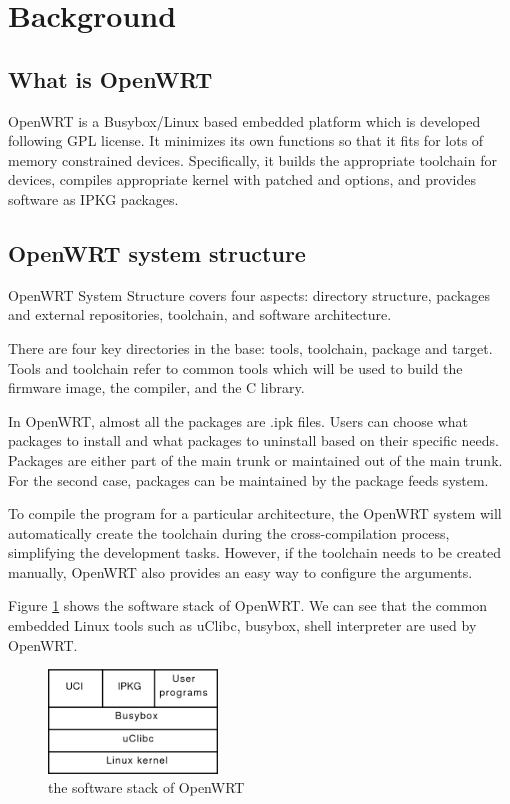 	\section{Background}
	
	\subsection{What is OpenWRT}
	OpenWRT \cite{fainelli2008OpenWRT, kim2014implementation} is a Busybox/Linux based embedded platform which is developed following GPL license. It minimizes its own functions so that it fits for lots of memory constrained devices. Specifically, it builds the appropriate toolchain for devices, compiles appropriate kernel with patched and options, and provides software as IPKG packages.
	
	\subsection{OpenWRT system structure}
	OpenWRT System Structure covers four aspects: directory structure, packages and external repositories, toolchain, and software architecture.
	
	There are four key directories in the base: tools, toolchain, package and target.
	Tools and toolchain refer to common tools which will be used to build the firmware image, the compiler, and the C library.
	
	In OpenWRT, almost all the packages are .ipk files. Users can choose what packages to install and what packages to uninstall based on their specific needs. Packages are either part of the main trunk or maintained out of the main trunk. For the second case, packages can be maintained by the package feeds system.
	
	To compile the program for a particular architecture, the OpenWRT system will automatically create the toolchain during the cross-compilation process, simplifying the development tasks. However, if the toolchain needs to be created manually, OpenWRT also provides an easy way to configure the arguments.
	
	Figure \ref{OpenWRT:stack} shows the software stack of OpenWRT. We can see that the common embedded Linux tools such as uClibc, busybox, shell interpreter are used by OpenWRT.
	
	\begin{figure}
		\centering
		\includegraphics[width=0.4\textwidth]{stack.png}
		\caption{the software stack of OpenWRT}
		\label{OpenWRT:stack}
	\end{figure}
